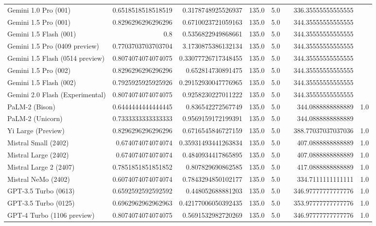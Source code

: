 \begin{table}[htp]
{\begin{tabular}{lrrrrrrr}
Gemini 1.0 Pro (001) & 0.6518518518518519 & 0.3178748925526937 & 135.0 & 5.0 &  & 336.35555555555555 &  \\
Gemini 1.5 Pro (001) & 0.8296296296296296 & 0.6710023721059163 & 135.0 & 5.0 &  & 344.35555555555555 &  \\
Gemini 1.5 Flash (001) & 0.8 & 0.5356822949868661 & 135.0 & 5.0 &  & 344.35555555555555 &  \\
Gemini 1.5 Pro (0409 preview) & 0.7703703703703704 & 3.1730875386132134 & 135.0 & 5.0 &  & 344.35555555555555 &  \\
Gemini 1.5 Flash (0514 preview) & 0.8074074074074075 & 0.33077726717348455 & 135.0 & 5.0 &  & 344.35555555555555 &  \\
Gemini 1.5 Pro (002) & 0.8296296296296296 & 0.652814730891475 & 135.0 & 5.0 &  & 344.35555555555555 &  \\
Gemini 1.5 Flash (002) & 0.7925925925925926 & 0.29152930047776965 & 135.0 & 5.0 &  & 344.35555555555555 &  \\
Gemini 2.0 Flash (Experimental) & 0.8074074074074075 & 0.9258230227011222 & 135.0 & 5.0 &  & 344.35555555555555 &  \\
PaLM-2 (Bison) & 0.6444444444444445 & 0.836542272567749 & 135.0 & 5.0 &  & 344.0888888888889 & 1.0 \\
PaLM-2 (Unicorn) & 0.7333333333333333 & 0.9569159172199391 & 135.0 & 5.0 &  & 344.0888888888889 &  \\
Yi Large (Preview) & 0.8296296296296296 & 0.6716545846727159 & 135.0 & 5.0 &  & 388.77037037037036 & 1.0 \\
Mistral Small (2402) & 0.674074074074074 & 0.35931493441263834 & 135.0 & 5.0 &  & 407.0888888888889 & 1.0 \\
Mistral Large (2402) & 0.674074074074074 & 0.4840934417865895 & 135.0 & 5.0 &  & 407.0888888888889 & 1.0 \\
Mistral Large 2 (2407) & 0.7851851851851852 & 0.807829690862585 & 135.0 & 5.0 &  & 417.0888888888889 & 1.0 \\
Mistral NeMo (2402) & 0.6074074074074074 & 0.7843294850102177 & 135.0 & 5.0 &  & 334.7111111111111 & 1.0 \\
GPT-3.5 Turbo (0613) & 0.6592592592592592 & 0.448052688881203 & 135.0 & 5.0 &  & 346.97777777777776 & 1.0 \\
GPT-3.5 Turbo (0125) & 0.6962962962962963 & 0.42177006050392435 & 135.0 & 5.0 &  & 353.97777777777776 & 1.0 \\
GPT-4 Turbo (1106 preview) & 0.8074074074074075 & 0.5691532982720269 & 135.0 & 5.0 &  & 346.97777777777776 & 1.0 \\

\end{tabular}}
\end{table}
